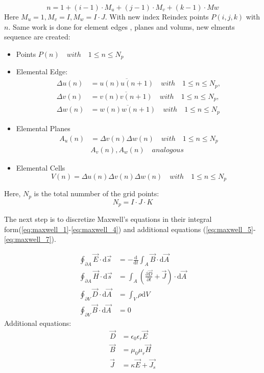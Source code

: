 \begin{equation}
n=1+(i-1)\cdot M_{u}+(j-1)\cdot M_{v}+(k-1)\cdot M{w}
\label{eq:discrete_index}
\end{equation}
Here $M_{u}=1,M_{v}=I,M_{w}=I\cdot J$. With new index
Reindex points $P(i,j,k)$ with $n$. Same work is done for element edges , planes and volums, new elments sequence are created:
\begin{itemize}
\item Points $P(n) \quad with \quad 1\leq n \leq N_{p}$
\item Elemental Edge:
    \begin{align}
		\Delta u(n)&=\overline{u(n)u(n+1)}  \quad with \quad 1\leq n \leq N_{p}, \nonumber\\
		\Delta v(n)&=\overline{v(n)v(n+1)}  \quad with \quad 1\leq n \leq N_{p}, \nonumber\\
		\Delta w(n)&=\overline{w(n)w(n+1)}  \quad with \quad 1\leq n \leq N_{p}
		\label{eq:discrete_edge_n}
		\end{align}
\item Elemental Planes
		\begin{align}
		A_{u}(n)&=\Delta v(n)\Delta w(n) \quad with \quad 1\leq n\leq N_{p}\nonumber\\
		&A_{v}(n),A_{w}(n)  \quad analogous
		\label{eq:discrete_plane_n}
		\end{align}
\item Elemental Cells
		\begin{equation}
		V(n)=\Delta u(n)\Delta v(n)\Delta w(n)  \quad with \quad 1\leq n\leq N_{p}
		\label{eq:discrete_cell_n}
		\end{equation}
\end{itemize}
Here, $N_{p}$ is the total nummber of the grid points:
\begin{equation}
N_{p}=I\cdot J\cdot K
\label{eq:np}
\end{equation}

The next step is to discretize Maxwell's equations in their integral form(\ref{eq:maxwell_1}-\ref{eq:maxwell_4}) and additional equations (\ref{eq:maxwell_5}-\ref{eq:maxwell_7}).

\begin{align}
\oint_{\partial A}\vec{E}\cdot\mathrm{d}\vec{s}&=
-\frac{\mathrm{d}}{\mathrm{d}t}\int_{A}\vec{B}\cdot\mathrm{d}\vec{A}
\label{eq:maxwell_1}\\
\oint_{\partial A}\vec{H}\cdot\mathrm{d}\vec{s}&=
\int_{A}(\frac{\partial\vec{D}}{\partial t}+\vec{J})\cdot\mathrm{d}\vec{A}
\label{eq:maxwell_2}\\
\oint_{\partial V}\vec{D}\cdot\mathrm{d}\vec{A}&=
\int_{V}\rho\mathrm{d}V
\label{eq:maxwell_3}\\
\oint_{\partial V}\vec{B}\cdot\mathrm{d}\vec{A}&=0
\label{eq:maxwell_4}
\end{align}
Additional equations:
\begin{align}
\vec{D}&=\epsilon_{0}\epsilon_{r}\vec{E}
\label{eq:maxwell_5}\\
\vec{B}&=\mu_{0}\mu_{r}\vec{H}
\label{eq:maxwell_6}\\
\vec{J}&=\kappa\vec{E}+\vec{J_{s}}
\label{eq:maxwell_7}
\end{align}